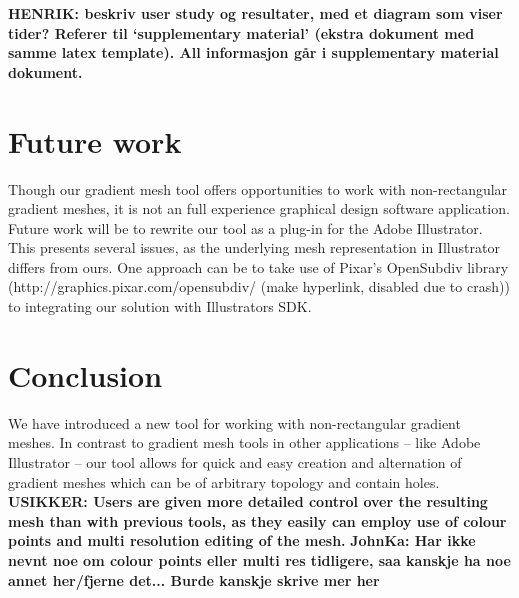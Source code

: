 \documentclass{egpubl}
\newcommand{\note}[3]{{\color{#2}\textbf{#1: #3}}}
\newcommand{\henrik}[1]{\note{HENRIK}{WildStrawberry}{#1}}
\newcommand{\john}[1]{\note{JohnKa}{RubineRed}{#1}}
\newcommand{\unsure}[1]{\note{USIKKER}{Green}{#1}}
\begin{document}
	\henrik{beskriv user study og resultater, med et diagram som viser tider? Referer til `supplementary material' (ekstra dokument med samme latex template). All informasjon går i supplementary material dokument.}
	
	\section{Future work}
	\label{sec:FW}
	
	Though our gradient mesh tool offers opportunities to work with non-rectangular gradient meshes, it is not an full experience graphical design software application. Future work will be to rewrite our tool as a plug-in for the Adobe Illustrator. This presents several issues, as the underlying mesh representation in Illustrator differs from ours. One approach can be to take use of Pixar's OpenSubdiv library (http://graphics.pixar.com/opensubdiv/ (make hyperlink, disabled due to crash)) to integrating our solution with Illustrators SDK.
	
	\section{Conclusion}
	
	We have introduced a new tool for working with non-rectangular gradient meshes. In contrast to gradient mesh tools in other applications -- like Adobe Illustrator -- our tool allows for quick and easy creation and alternation of gradient meshes which can be of arbitrary topology and contain holes. \unsure{Users are given more detailed control over the resulting mesh than with previous tools, as they easily can employ use of colour points and multi resolution editing of the mesh.}  \john{Har ikke nevnt noe om colour points eller multi res tidligere, saa kanskje ha noe annet her/fjerne det... Burde kanskje skrive mer her}
	
	
	
	
	
\end{document}
